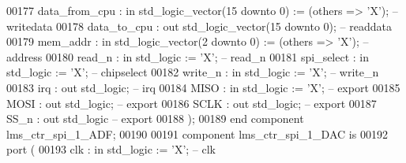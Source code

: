 \begin{DoxyCode}
00177             data\_from\_cpu : \textcolor{keywordflow}{in}  \textcolor{comment}{std\_logic\_vector}(\textcolor{vhdllogic}{}\textcolor{vhdllogic}{15} \textcolor{keywordflow}{downto} \textcolor{vhdllogic}{}\textcolor{vhdllogic}{0}) := (\textcolor{keywordflow}{others} => 'X'); \textcolor{keyword}{-- writedata}
00178             data\_to\_cpu   : \textcolor{keywordflow}{out} \textcolor{comment}{std\_logic\_vector}(\textcolor{vhdllogic}{}\textcolor{vhdllogic}{15} \textcolor{keywordflow}{downto} \textcolor{vhdllogic}{}\textcolor{vhdllogic}{0});                    \textcolor{keyword}{-- readdata}
00179             mem\_addr      : \textcolor{keywordflow}{in}  \textcolor{comment}{std\_logic\_vector}(\textcolor{vhdllogic}{}\textcolor{vhdllogic}{2} \textcolor{keywordflow}{downto} \textcolor{vhdllogic}{}\textcolor{vhdllogic}{0})  := (\textcolor{keywordflow}{others} => 'X'); \textcolor{keyword}{-- address}
00180             read\_n        : \textcolor{keywordflow}{in}  \textcolor{comment}{std\_logic}                     := 'X';             \textcolor{keyword}{-- read\_n}
00181             spi\_select    : \textcolor{keywordflow}{in}  \textcolor{comment}{std\_logic}                     := 'X';             \textcolor{keyword}{-- chipselect}
00182             write\_n       : \textcolor{keywordflow}{in}  \textcolor{comment}{std\_logic}                     := 'X';             \textcolor{keyword}{-- write\_n}
00183             irq           : \textcolor{keywordflow}{out} \textcolor{comment}{std\_logic};                                        \textcolor{keyword}{-- irq}
00184             MISO          : \textcolor{keywordflow}{in}  \textcolor{comment}{std\_logic}                     := 'X';             \textcolor{keyword}{-- export}
00185             MOSI          : \textcolor{keywordflow}{out} \textcolor{comment}{std\_logic};                                        \textcolor{keyword}{-- export}
00186             SCLK          : \textcolor{keywordflow}{out} \textcolor{comment}{std\_logic};                                        \textcolor{keyword}{-- export}
00187             SS\_n          : \textcolor{keywordflow}{out} \textcolor{comment}{std\_logic}\textcolor{keyword}{                                         -- export}
00188         );
00189     \textcolor{keywordflow}{end} \textcolor{keywordflow}{component} \textcolor{vhdlchar}{lms_ctr_spi_1_ADF};
00190 
00191     \textcolor{keywordflow}{component} lms\_ctr\_spi\_1\_DAC \textcolor{keywordflow}{is}
00192         \textcolor{keywordflow}{port} (
00193             clk           : \textcolor{keywordflow}{in}  \textcolor{comment}{std\_logic}                     := 'X';             \textcolor{keyword}{-- clk}

\end{DoxyCode}
